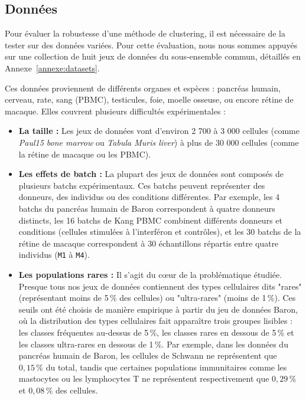 \subsection{Données}

Pour évaluer la robustesse d'une méthode de clustering, il est nécessaire de la tester sur des données variées. Pour cette évaluation, nous nous sommes appuyés sur une collection de huit jeux de données du sous-ensemble commun, détaillés en Annexe~\ref{annexe:datasets}.

Ces données proviennent de différents organes et espèces : pancréas humain, cerveau, rate, sang (PBMC), testicules, foie, moelle osseuse, ou encore rétine de macaque. Elles couvrent plusieurs difficultés expérimentales :
\begin{itemize}
    \item \textbf{La taille :} Les jeux de données vont d'environ 2 700 à 3 000 cellules (comme \textit{Paul15 bone marrow} ou \textit{Tabula Muris liver}) à plus de 30 000 cellules (comme la rétine de macaque ou les PBMC).
    \item \textbf{Les effets de batch :} La plupart des jeux de données sont composés de plusieurs batchs expérimentaux. Ces batchs peuvent représenter des donneurs, des individus ou des conditions différentes. Par exemple, les 4 batchs du pancréas humain de Baron correspondent à quatre donneurs distincts, les 16 batchs de Kang PBMC combinent différents donneurs et conditions (cellules stimulées à l'interféron et contrôles), et les 30 batchs de la rétine de macaque correspondent à 30 échantillons répartis entre quatre individus (\texttt{M1} à \texttt{M4}).
    \item \textbf{Les populations rares :} Il s'agit du cœur de la problématique étudiée. Presque tous nos jeux de données contiennent des types cellulaires dits "rares" (représentant moins de 5\,\% des cellules) ou "ultra-rares" (moins de 1\,\%). Ces seuils ont été choisis de manière empirique à partir du jeu de données Baron, où la distribution des types cellulaires fait apparaître trois groupes lisibles : les classes fréquentes au-dessus de 5\,\%, les classes rares en dessous de 5\,\% et les classes ultra-rares en dessous de 1\,\%. Par exemple, dans les données du pancréas humain de Baron, les cellules de Schwann ne représentent que $0{,}15\,\%$ du total, tandis que certaines populations immunitaires comme les mastocytes ou les lymphocytes T ne représentent respectivement que $0{,}29\,\%$ et $0{,}08\,\%$ des cellules.
\end{itemize}

